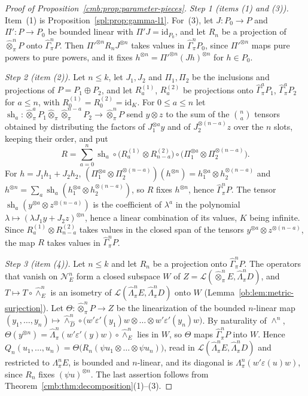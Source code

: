 \documentclass[11pt]{amsart}
\theoremstyle{definition}
\theoremstyle{remark}
\numberwithin{equation}{section}
\newcommand{\cL}{\mathcal L}
\newcommand{\id}{\mathrm{id}}
\theoremstyle{plain}
\theoremstyle{definition}
\theoremstyle{plain}
\newcommand{\hot}{\mathbin{\widehat\otimes}}
\newcommand{\hGamma}{\widehat\Gamma}
\newcommand{\cN}{\mathcal N}
\begin{document}
\begin{proof}[Proof of Proposition~\ref{cmb:prop:parameter-pieces}]
\emph{Step 1 (items (1) and (3)).} Item~(1) is Proposition~\ref{spl:prop:gamma-l1}. For~(3), let $J\colon P_0\to P$ and
$\Pi'\colon P\to P_0$ be bounded linear with $\Pi'J=\id_{P_0}$, and let $R_n$ be a projection of $\widehat\otimes^n_\pi P$
onto $\hGamma^n_\pi P$. Then ${\Pi'}^{\otimes n}R_nJ^{\otimes n}$ takes values in $\hGamma^n_\pi P_0$, since
${\Pi'}^{\otimes n}$ maps pure powers to pure powers, and it fixes $h^{\otimes n}={\Pi'}^{\otimes n}(Jh)^{\otimes n}$ for
$h\in P_0$.

\emph{Step 2 (item (2)).} Let $n\le k$, let $J_1,J_2$ and $\Pi_1,\Pi_2$ be the inclusions and projections of
$P=P_1\oplus P_2$, and let $R^{(1)}_a$, $R^{(2)}_a$ be projections onto $\hGamma^a_\pi P_1$, $\hGamma^a_\pi P_2$ for
$a\le n$, with $R^{(1)}_0=R^{(2)}_0=\id_K$. For $0\le a\le n$ let
$\operatorname{sh}_a\colon\widehat\otimes^a_\pi P_1\hot_\pi\widehat\otimes^{n-a}_\pi P_2\to\widehat\otimes^n_\pi P$ send
$y\otimes z$ to the sum of the $\binom na$ tensors obtained by distributing the factors of $J_1^{\otimes a}y$ and of
$J_2^{\otimes(n-a)}z$ over the $n$ slots, keeping their order, and put
\[
 R=\sum_{a=0}^n\operatorname{sh}_a\circ\bigl(R^{(1)}_a\otimes R^{(2)}_{n-a}\bigr)\circ
 \bigl(\Pi_1^{\otimes a}\otimes\Pi_2^{\otimes(n-a)}\bigr).
\]
For $h=J_1h_1+J_2h_2$, $(\Pi_1^{\otimes a}\otimes\Pi_2^{\otimes(n-a)})(h^{\otimes n})=h_1^{\otimes a}\otimes
h_2^{\otimes(n-a)}$ and $h^{\otimes n}=\sum_a\operatorname{sh}_a(h_1^{\otimes a}\otimes h_2^{\otimes(n-a)})$, so $R$ fixes
$h^{\otimes n}$, hence $\hGamma^n_\pi P$. The tensor $\operatorname{sh}_a(y^{\otimes a}\otimes z^{\otimes(n-a)})$ is the
coefficient of $\lambda^a$ in the polynomial $\lambda\mapsto(\lambda J_1y+J_2z)^{\otimes n}$, hence a linear combination of
its values, $K$ being infinite. Since $R^{(1)}_a\otimes R^{(2)}_{n-a}$ takes values in the closed span of the tensors
$y^{\otimes a}\otimes z^{\otimes(n-a)}$, the map $R$ takes values in $\hGamma^n_\pi P$.

\emph{Step 3 (item (4)).} Let $n\le k$ and let $R_n$ be a projection onto $\hGamma^n_\pi P$. The operators that vanish on
$\cN^n_E$ form a closed subspace $W$ of $Z=\cL(\widehat\otimes^n_\pi E,\widehat\Lambda^n_\pi D)$, and
$T\mapsto T\circ\widehat\wedge^n_E$ is an isometry of $\cL(\widehat\Lambda^n_\pi E,\widehat\Lambda^n_\pi D)$ onto $W$
(Lemma~\ref{ob:lem:metric-surjection}). Let $\Theta\colon\widehat\otimes^n_\pi P\to Z$ be the linearization of the bounded
$n$-linear map
$(y_1,\dots,y_n)\mapsto\widehat\wedge^n_{\widehat D}\circ\bigl(w'\varepsilon'(y_1)w\otimes\dots\otimes w'\varepsilon'(y_n)w\bigr)$.
By naturality of $\wedge^n$, $\Theta(y^{\otimes n})=\widehat\Lambda^n_\pi(w'\varepsilon'(y)w)\circ\widehat\wedge^n_E$ lies in
$W$, so $\Theta$ maps $\hGamma^n_\pi P$ into $W$. Hence
$Q_n(u_1,\dots,u_n)=\Theta\bigl(R_n(\psi u_1\otimes\dots\otimes\psi u_n)\bigr)$, read in
$\cL(\widehat\Lambda^n_\pi E,\widehat\Lambda^n_\pi D)$ and restricted to $\Lambda^n_\pi E$, is bounded and $n$-linear, and
its diagonal is $\Lambda^n_\pi(w'\varepsilon(u)w)$, since $R_n$ fixes $(\psi u)^{\otimes n}$. The last assertion follows
from Theorem~\ref{cmb:thm:decomposition}(1)--(3).
\end{proof}
\end{document}
